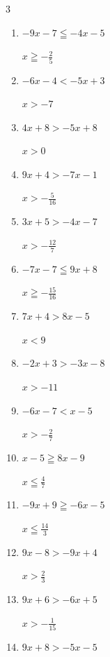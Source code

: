 \begin{multicols}{3}
\begin{enumerate}
        $\displaystyle x>-\frac{5}{2}$

  \item $-9x-7\leqq -4x-5$

        $\displaystyle x\geqq -\frac{2}{5}$

  \item $-6x-4<-5x+3$

        $\displaystyle x>-7$

  \item $4x+8>-5x+8$

        $\displaystyle x>0$

  \item $9x+4>-7x-1$

        $\displaystyle x>-\frac{5}{16}$

  \item $3x+5>-4x-7$

        $\displaystyle x>-\frac{12}{7}$

  \item $-7x-7\leqq 9x+8$

        $\displaystyle x\geqq -\frac{15}{16}$

\columnbreak %

\resetques

  \item $7x+4>8x-5$

        $\displaystyle x<9$

  \item $-2x+3>-3x-8$

        $\displaystyle x>-11$

  \item $-6x-7<x-5$

        $\displaystyle x>-\frac{2}{7}$

  \item $x-5\geqq 8x-9$

        $\displaystyle x\leqq \frac{4}{7}$

  \item $-9x+9\geqq -6x-5$

        $\displaystyle x\leqq \frac{14}{3}$

  \item $9x-8>-9x+4$

        $\displaystyle x>\frac{2}{3}$

  \item $9x+6>-6x+5$

        $\displaystyle x>-\frac{1}{15}$

  \item $9x+8>-5x-5$


\end{enumerate}
\end{multicols}
